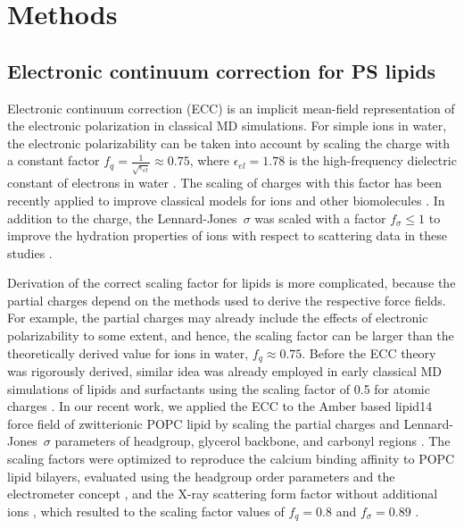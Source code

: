 \documentclass[journal=jpcbfk,manuscript=article]{achemso}
\begin{document}
 
\section{Methods} 
 
\subsection{Electronic continuum correction for PS lipids}\label{section:ecc} 

Electronic continuum correction (ECC) is an implicit mean-field representation of 
the electronic polarization in classical MD simulations. 
For simple ions in water, the electronic polarizability
can be taken into account by scaling the charge with a constant factor 
 \mbox{$ f_q = \frac{1}{\sqrt{\epsilon_{el}}} \approx 0.75$,}
where  $\epsilon_{el} = 1.78$ is the high-frequency dielectric constant of electrons in water \cite{leontyev09}.
The scaling of charges with this factor has been recently applied to improve classical models for ions and
other biomolecules \cite{Pluharova2014, martinek17, duboue2018insulin, Mason2019, Duboue2018MgZn} .
In addition to the charge, the Lennard-Jones~$\sigma$ was scaled with a factor $f_\sigma \leq 1$
to improve the hydration properties of ions with respect to scattering data in these studies
.

Derivation of the correct scaling factor for lipids is more complicated, because
the partial charges depend on the methods used to derive the respective force fields.
For example, the partial charges may already include the effects of electronic polarizability to some extent,
and hence, the scaling factor can be larger than the theoretically derived value for ions in water, $f_q \approx 0.75$.
Before the ECC theory was rigorously derived, similar idea was already employed in early classical 
MD simulations of lipids and surfactants using the scaling factor of 0.5 for atomic charges  \cite{jonsson86,egberts94, berendsen1996}. 
In our recent work, we applied the ECC to the Amber based lipid14 force field of zwitterionic POPC lipid \cite{dickson14}
by scaling the partial charges and Lennard-Jones~$\sigma$ parameters of headgroup, glycerol backbone,
and carbonyl regions \cite{melcr18}. The scaling factors were optimized to reproduce 
the calcium binding affinity to POPC lipid bilayers, evaluated using the headgroup order parameters
and the electrometer concept \cite{akutsu81,altenbach84,seelig87,catte16}, and the X-ray scattering form factor
without additional ions \cite{kucerka11}, which resulted to the scaling factor values of $f_q = 0.8$ and $f_\sigma = 0.89$  \cite{melcr18}.
\end{document}
